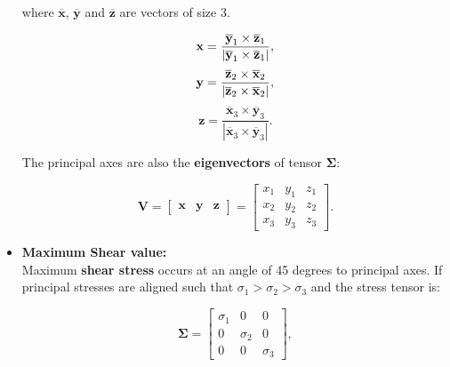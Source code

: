 \documentclass[10pt,b5paper,titlepage]{book}
\begin{document}
\begin{itemize}
        where $\overline{\mathbf{x}}$, $\overline{\mathbf{y}}$ and $\overline{\mathbf{z}}$ are vectors of size 3.

        \begin{equation}
              \mathbf{x} = \frac{\overline{\mathbf{y}}_{1} \times \overline{\mathbf{z}}_{1}}
              {|\overline{\mathbf{y}}_{1} \times \overline{\mathbf{z}}_{1}|}\\
        ,\end{equation}
        \begin{equation}
              \mathbf{y} = \frac{\overline{\mathbf{z}}_{2} \times \overline{\mathbf{x}}_{2}}
              {|\overline{\mathbf{z}}_{2} \times \overline{\mathbf{x}}_{2}|}\\
        ,\end{equation}
        \begin{equation}
              \mathbf{z} = \frac{\overline{\mathbf{x}}_{3} \times \overline{\mathbf{y}}_{3}}
              {|\overline{\mathbf{x}}_{3} \times \overline{\mathbf{y}}_{3}|}
        .\end{equation}

        The principal axes are also the \textbf{eigenvectors} of tensor $\mathbf{\Sigma}$:

        \begin{equation}
            \mathbf{V} = \begin{bmatrix}
                \mathbf{x} & \mathbf{y} & \mathbf{z}
            \end{bmatrix} = \begin{bmatrix}
                x_1 & y_1 & z_1 \\
                x_2 & y_2 & z_2 \\
                x_3 & y_3 & z_3
            \end{bmatrix}
        .\end{equation}

    \item \textbf{Maximum Shear value:}\\


        Maximum \textbf{shear stress} occurs at an angle of 45 degrees to principal axes.
        If principal stresses are aligned such that $\sigma_1 > \sigma_2 > \sigma_3$
        and the stress tensor is:

        \begin{equation}
            \mathbf{\Sigma} = \begin{bmatrix}
                \sigma_1 & 0 & 0 \\
                0 & \sigma_2 & 0 \\
                0 & 0 & \sigma_3
            \end{bmatrix}
        ,\end{equation}


\end{itemize}
\end{document}
